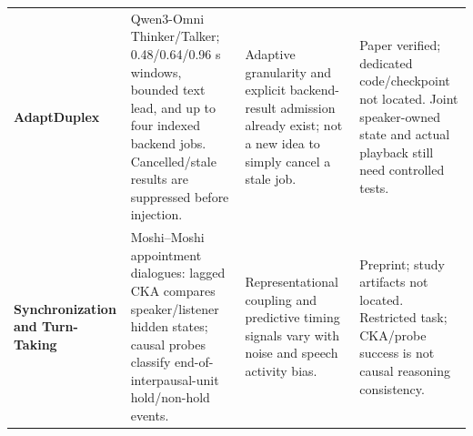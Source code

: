 \begin{table}[H]
\begin{tabular}{@{}>{\raggedright\arraybackslash}p{0.22\tablewidth}>{\raggedright\arraybackslash}p{0.30\tablewidth}>{\raggedright\arraybackslash}p{0.27\tablewidth}>{\raggedright\arraybackslash}p{0.21\tablewidth}@{}}
\addlinespace[4pt]
\textbf{AdaptDuplex}\par\citep{adapt} & Qwen3-Omni Thinker/Talker; 0.48/0.64/0.96 s windows, bounded text lead, and up to four indexed backend jobs. Cancelled/stale results are suppressed before injection. & Adaptive granularity and explicit backend-result admission already exist; not a new idea to simply cancel a stale job. & Paper verified; dedicated code/checkpoint not located. Joint speaker-owned state and actual playback still need controlled tests. \\
\addlinespace[4pt]
\textbf{Synchronization and Turn-Taking}\par\citep{synchrony} & Moshi--Moshi appointment dialogues: lagged CKA compares speaker/listener hidden states; causal probes classify end-of-interpausal-unit hold/non-hold events. & Representational coupling and predictive timing signals vary with noise and speech activity bias. & Preprint; study artifacts not located. Restricted task; CKA/probe success is not causal reasoning consistency. \\
\bottomrule
\end{tabular}
\end{table}
